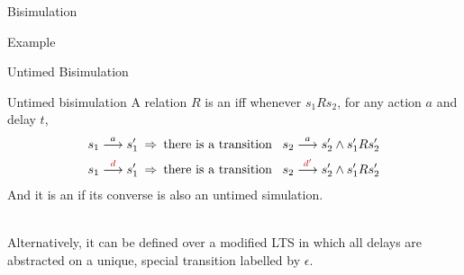 \documentclass[aspectratio=169]{beamer}
\begin{document}
\begin{slide}{Bisimulation}
\small

\begin{exampleblock}{Example}
\centering
~~~~
\end{exampleblock}



\end{slide}



\begin{slide}{Untimed Bisimulation}
\small

\begin{block}{Untimed bisimulation}
A relation $R$ is an  iff whenever $s_1 R s_2$, for any action $a$ and delay $t$,
\begin{align*}
s_1 \tran{a} s_1' \; & \imp\; \text{there is a transition}\; \; \; s_2 \tran{a} s_2' \land s_1' R s_2'\\
s_1 \tran{{\red{d}}} s_1'\; & \imp\; \text{there is a transition}\; \; \; s_2 \tran{{\red{d'}}} s_2' \land s_1' R s_2'
\end{align*}
And it is an  if its converse is also an untimed simulation.
\end{block}
~\\


\alert{Alternatively, it can be defined over a modified LTS in which all delays are abstracted on a 
unique, special transition labelled by $\epsilon$.}
\end{slide}
\end{document}
